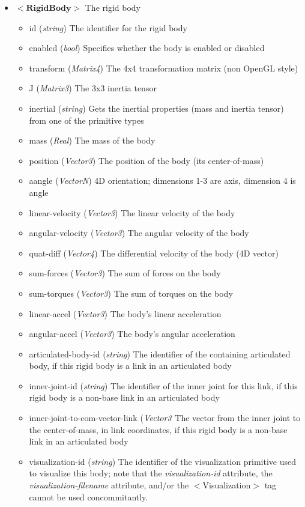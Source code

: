 \documentclass{article}
\begin{document}
\begin{landscape}
\begin{itemize}
\item $<\textbf{RigidBody}>$ The rigid body
\begin{itemize}
\item id  (\emph{string})  The identifier for the rigid body
\item enabled (\emph{bool})  Specifies whether the body is enabled or disabled
\item transform (\emph{Matrix4})  The 4x4 transformation matrix (non OpenGL style)
\item J (\emph{Matrix3})  The 3x3 inertia tensor
\item inertial (\emph{string})  Gets the inertial properties (mass and inertia tensor) from one of the primitive types
\item mass (\emph{Real})  The mass of the body
\item position (\emph{Vector3})  The position of the body (its center-of-mass)
\item aangle (\emph{VectorN})  4D orientation; dimensions 1-3 are axis, dimension 4 is angle
\item linear-velocity (\emph{Vector3})  The linear velocity of the body 
\item angular-velocity (\emph{Vector3})  The angular velocity of the body 
\item quat-diff (\emph{Vector4})  The differential velocity of the body (4D vector)
\item sum-forces (\emph{Vector3})  The sum of forces on the body 
\item sum-torques (\emph{Vector3})  The sum of torques on the body 
\item linear-accel (\emph{Vector3}) The body's linear acceleration 
\item angular-accel (\emph{Vector3}) The body's angular acceleration 
\item articulated-body-id (\emph{string})  The identifier of the containing articulated body, if this rigid body is a link in an articulated body
\item inner-joint-id (\emph{string})  The identifier of the inner joint for this link, if this rigid body is a non-base link in an articulated body
\item inner-joint-to-com-vector-link ($\emph{Vector3}$ The vector from the inner joint to the center-of-mass, in link coordinates, if this rigid body is a non-base link in an articulated body 
\item visualization-id (\emph{string})  The identifier of the visualization primitive used to visualize this body; note that the \emph{visualization-id} attribute, the \emph{visualization-filename} attribute, and/or the $<$Visualization$>$ tag cannot be used concommitantly.

\end{itemize}
\end{itemize}
\end{landscape}
\end{document}

